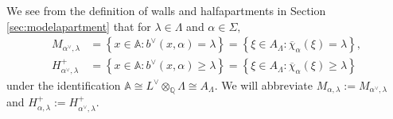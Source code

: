\documentclass[12pt]{amsart}
\newcommand{\Q}{\mathbb{Q} }
\newcommand{\A}{\mathbb{A}}
\numberwithin{equation}{section}
\theoremstyle{remark} %
\begin{document}
We see from the definition of walls and halfapartments in Section \ref{sec:modelapartment} that for $\lambda \in \Lambda$ and $\alpha \in \Sigma,$
\begin{align*}
	M_{\alpha^\vee, \lambda}& = \left\{ x\in \A \colon b^\vee(x,\alpha) = \lambda \right\} 
	= \left\{ \xi \in A_\Lambda \colon \overline{\chi}_\alpha(\xi) = \lambda \right\} , \\
		H_{\alpha^\vee, \lambda}^+& = \left\{ x\in \A \colon b^\vee(x,\alpha) \geq \lambda \right\} 
	= \left\{ \xi \in A_\Lambda \colon \overline{\chi}_\alpha(\xi) \geq \lambda \right\}
\end{align*}
under the identification $\A \cong L^{\vee} \otimes_\Q \Lambda \cong A_\Lambda$. We will abbreviate $M_{\alpha,\lambda} := M_{\alpha^\vee, \lambda}$ and  $H_{\alpha,\lambda}^+ := H_{\alpha^\vee, \lambda}^+$.
\end{document}
